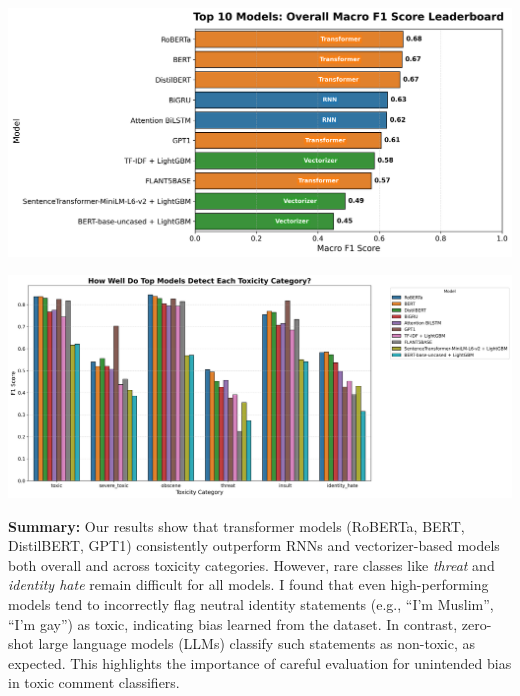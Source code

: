 
{
    \begin{center}
        \begin{minipage}{0.48\linewidth}
            \includegraphics[width=\linewidth]{figures/macro_f1_comparison_1.png}
        \end{minipage}
        \hfill
        \begin{minipage}{0.48\linewidth}
            \includegraphics[width=\linewidth]{figures/per_class_f1_comparison.png}
        \end{minipage}
        \vspace{1em}
        \normalsize
        \begin{flushleft}
        \textbf{Summary:} Our results show that transformer models (RoBERTa, BERT, DistilBERT, GPT1) consistently outperform RNNs and vectorizer-based models both overall and across toxicity categories. However, rare classes like \textit{threat} and \textit{identity hate} remain difficult for all models. I found that even high-performing models tend to incorrectly flag neutral identity statements (e.g., ``I'm Muslim'', ``I'm gay'') as toxic, indicating bias learned from the dataset. In contrast, zero-shot large language models (LLMs) classify such statements as non-toxic, as expected. This highlights the importance of careful evaluation for unintended bias in toxic comment classifiers.
        \end{flushleft}
    \end{center}
}


